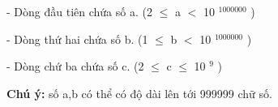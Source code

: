 - Dòng đầu tiên chứa số a. (2  $\le$  a $<$ 10   $^     1000000    $    )   



    - Dòng thứ hai chứa số b. (1  $\le$  b $<$ 10   $^     1000000    $    )   



    - Dòng chứ ba chứa số c. (2 $\le$ c $\le$ 10   $^     9    $    )   



\textbf{     Chú ý:    }    số a,b có thể có độ dài lên tới 999999 chữ số.